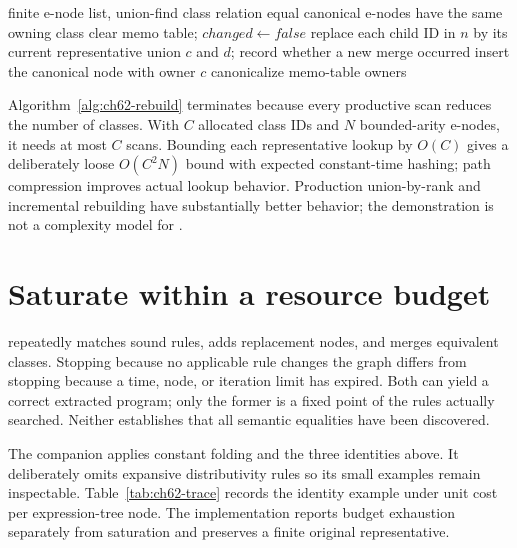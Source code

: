 \begin{algorithm}[htbp]
\caption{Rebuild congruence after class unions.}
\label{alg:ch62-rebuild}
\begin{pseudocode}
\Require finite e-node list, union-find class relation
\Ensure equal canonical e-nodes have the same owning class
\Repeat
  \State clear memo table; $changed\gets false$
    \State replace each child ID in $n$ by its current representative
      \State union $c$ and $d$; record whether a new merge occurred
    \Else
      \State insert the canonical node with owner $c$
    \EndIf
  \EndFor
{}
\State canonicalize memo-table owners
\end{pseudocode}
\end{algorithm}

Algorithm~\ref{alg:ch62-rebuild} terminates because every productive scan reduces the number of classes.
With $C$ allocated class IDs and $N$ bounded-arity e-nodes, it needs at most $C$ scans.
Bounding each representative lookup by $O(C)$ gives a deliberately loose $O(C^2N)$ bound with expected constant-time hashing; path compression improves actual lookup behavior.
Production union-by-rank and incremental rebuilding have substantially better behavior; the demonstration is not a complexity model for .

\section{Saturate within a resource budget}
\label{sec:ch62-budget}

 repeatedly matches sound rules, adds replacement nodes, and merges equivalent classes.
Stopping because no applicable rule changes the graph differs from stopping because a time, node, or iteration limit has expired.
Both can yield a correct extracted program; only the former is a fixed point of the rules actually searched.
Neither establishes that all semantic equalities have been discovered.

The companion applies constant folding and the three identities above.
It deliberately omits expansive distributivity rules so its small examples remain inspectable.
Table~\ref{tab:ch62-trace} records the identity example under unit cost per expression-tree node.
The implementation reports budget exhaustion separately from saturation and preserves a finite original representative.

